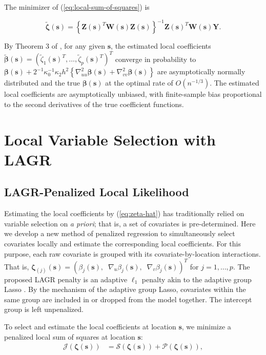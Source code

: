 \documentclass[authoryear,review, 12pt]{elsarticle}
\begin{document}
The minimizer of (\ref{eq:local-sum-of-squares}) is

\begin{equation}
\tilde{\bm{\zeta}}(\bm{s})=\left\{ \bm{Z}(\bm{s})^{T}\bm{W}\!(\bm{s})\bm{Z}(\bm{s})\right\} ^{-1}\bm{Z}(\bm{s})^{T}\bm{W}\!(\bm{s})\bm{Y}.\label{eq:zeta-hat}
\end{equation}


By Theorem 3 of \citet{Sun-Yan-Zhang-Lu-2014}, for any given $\bm{s}$,
the estimated local coefficients $\tilde{\bm{\beta}}(\bm{s})=\left(\tilde{\zeta}_{1}(\bm{s})^{T},\dots,\tilde{\zeta}_{p}(\bm{s})^{T}\right)^{T}$
converge in probability to $\bm{\beta}(\bm{s})+2^{-1}\kappa_{0}^{-1}\kappa_{2}h^{2}\left\{ \nabla_{uu}^{2}\bm{\beta}(\bm{s})+\nabla_{vv}^{2}\bm{\beta}(\bm{s})\right\} $
are asymptotically normally distributed and the true $\bm{\beta}(\bm{s})$
at the optimal rate of $O\left(n^{-1/3}\right)$. The estimated local
coefficients are asymptotically unbiased, with finite-sample bias
proportional to the second derivatives of the true coefficient functions.


\section{Local Variable Selection with LAGR\label{sec:lagr-gaussian}}


\subsection{LAGR-Penalized Local Likelihood}

Estimating the local coefficients by (\ref{eq:zeta-hat}) has traditionally
relied on variable selection on \emph{a priori}; that is, a set of
covariates is pre-determined. Here we develop a new method of penalized
regression to simultaneously select covariates locally and estimate
the corresponding local coefficients. For this purpose, each raw covariate
is grouped with its covariate-by-location interactions. That is, $\bm{\zeta}_{(j)}(\bm{s})=\left(\beta_{j}(\bm{s}),\;\;\nabla_{u}\beta_{j}(\bm{s}),\;\;\nabla_{v}\beta_{j}(\bm{s})\right)^{T}$
for $j=1,\dots,p$. The proposed LAGR penalty is an adaptive $\ell_{1}$
penalty akin to the adaptive group Lasso \citep{Yuan-Lin-2006,Wang-Leng-2008}.
By the mechanism of the adaptive group Lasso, covariates within the
same group are included in or dropped from the model together. The
intercept group is left unpenalized.

To select and estimate the local coefficients at location $\bm{s}$,
we minimize a penalized local sum of squares at location $\bm{s}$:
\begin{align}
\mathcal{J}\left(\bm{\zeta}(\bm{s})\right) & =\mathcal{S}\left(\bm{\zeta}(\bm{s})\right)+\mathcal{P}\left(\bm{\zeta}(\bm{s})\right),\label{eq:penalized-least-squares}
\end{align}
\end{document}
